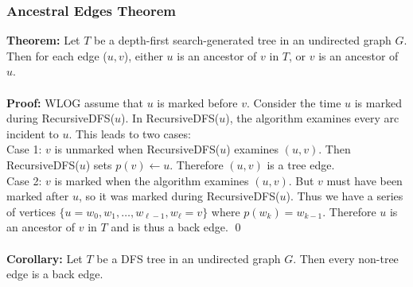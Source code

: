 \documentclass{article}
\newcommand{\thm}{\textbf{Theorem: }}
\newcommand{\cor}{\textbf{Corollary: }}
\newcommand{\proo}{\textbf{Proof: }}
\begin{document}
\subsubsection{Ancestral Edges Theorem}
\thm Let $T$ be a depth-first search-generated tree in an undirected graph $G$. Then for each edge ($u, v$), either $u$ is an ancestor of $v$ in $T$, or $v$ is an ancestor of $u$.\\\\
\proo WLOG assume that $u$ is marked before $v$. Consider the time $u$ is marked during RecursiveDFS($u$). In RecursiveDFS($u$), the algorithm examines every arc incident to $u$. This leads to two cases:\\
Case 1: $v$ is unmarked when RecursiveDFS($u$) examines $(u, v)$. Then RecursiveDFS($u$) sets $p(v) \leftarrow u$. Therefore $(u, v)$ is a tree edge.\\
Case 2: $v$ is marked when the algorithm examines $(u, v)$. But $v$ must have been marked after $u$, so it was marked during RecursiveDFS($u$). Thus we have a series of vertices $\{u = w_0, w_1, \dots, w_{\ell -1}, w_{\ell} = v\}$ where $p(w_k) = w_{k-1}$. Therefore $u$ is an ancestor of $v$ in $T$ and is thus a back edge.
\qed
\ \\\\
\cor Let $T$ be a DFS tree in an undirected graph $G$. Then every non-tree edge is a back edge.
\end{document}
